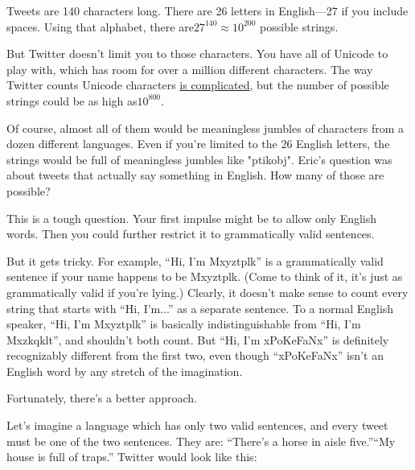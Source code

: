 {Tweets are 140 characters long. There are 26 letters in English—27 if you include spaces. Using that alphabet, there are\( 27^{140}\approx 10^{200}\) possible strings.}

{But Twitter doesn't limit you to those characters. You have all of Unicode to play with, which has room for over a million different characters. The way Twitter counts Unicode characters \href{https://dev.twitter.com/docs/counting-characters}{is complicated}, but the number of possible strings could be as high as\( 10^{800}\).}

{Of course, almost all of them would be meaningless jumbles of characters from a dozen different languages. Even if you're limited to the 26 English letters, the strings would be full of meaningless jumbles like "ptikobj". Eric's question was about tweets that actually say something in English. How many of those are possible?}

{This is a tough question. Your first impulse might be to allow only English words. Then you could further restrict it to grammatically valid sentences.}

{But it gets tricky. For example, “Hi, I’m Mxyztplk” is a grammatically valid sentence if your name happens to be Mxyztplk. (Come to think of it, it’s just as grammatically valid if you’re lying.) Clearly, it doesn’t make sense to count every string that starts with “Hi, I’m...” as a separate sentence. To a normal English speaker, “Hi, I’m Mxyztplk” is basically indistinguishable from “Hi, I’m Mxzkqklt”, and shouldn't both count. But “Hi, I’m xPoKeFaNx” is definitely recognizably different from the first two, even though “xPoKeFaNx” isn’t an English word by any stretch of the imagination.}

{Fortunately, there’s a better approach.}

{Let’s imagine a language which has only two valid sentences, and every tweet must be one of the two sentences. They are:}
“There’s a horse in aisle five.”“My house is full of traps.”
{Twitter would look like this:}

